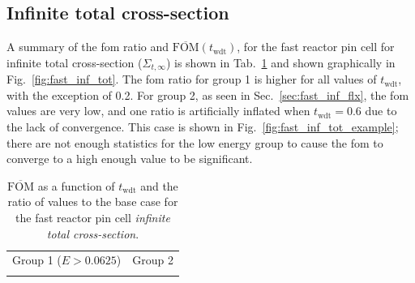 \subsection{Infinite total cross-section}
\label{sec:fast_inf_tot_cross_section}
A summary of the \gls{fom} ratio and
$\overline{\mathrm{FOM}}(t_{\mathrm{wdt}})$, for the fast reactor pin
cell for infinite total cross-section ($\Sigma_{t,
  \infty}$) is shown in Tab.~\ref{tab:fast_inf_tot} and shown
graphically in Fig.~\ref{fig:fast_inf_tot}. The \gls{fom} ratio for
group 1 is higher for all values of $t_{\mathrm{wdt}}$, with the
exception of 0.2. For group 2, as seen in Sec.~\ref{sec:fast_inf_flx}, the
\gls{fom} values are very low, and one ratio is artificially inflated
when $t_{\mathrm{wdt}} = 0.6$
due to the lack of convergence. This case is shown in
Fig.~\ref{fig:fast_inf_tot_example}; there are not enough statistics
for the low energy group to cause the \gls{fom} to converge to a high
enough value to be significant.
\begin{table}[hbtp]
  \centering
  \caption[$\overline{\mathrm{FOM}}$ and ratio for
  the fast reactor pin cell \textit{infinite total cross-section}.]{$\overline{\mathrm{FOM}}$ as a function of
    $t_{\mathrm{wdt}}$ and the ratio of values to the base case for
    the fast reactor pin cell \textit{infinite total cross-section}.}
  \begin{tabular}{cc} Group 1 ($E > 0.0625$) & Group 2 \\
    
 &
   
  \end{tabular}
\label{tab:fast_inf_tot}
\end{table}

